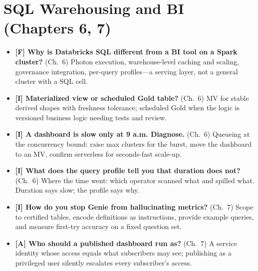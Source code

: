 \section{SQL Warehousing and BI (Chapters 6, 7)}
%
\begin{itemize}
    \item \textbf{[F] Why is Databricks SQL different from a BI tool on a Spark cluster?}
    (Ch.~6) Photon execution, warehouse-level caching and scaling, governance integration,
    per-query profiles---a serving layer, not a general cluster with a SQL cell.
    \item \textbf{[I] Materialized view or scheduled Gold table?} (Ch.~6) MV for stable
    derived shapes with freshness tolerance; scheduled Gold when the logic is versioned
    business logic needing tests and review.
    \item \textbf{[I] A dashboard is slow only at 9 a.m. Diagnose.} (Ch.~6) Queueing at the
    concurrency bound: raise max clusters for the burst, move the dashboard to an MV, confirm
    serverless for seconds-fast scale-up.
    \item \textbf{[I] What does the query profile tell you that duration does not?} (Ch.~6)
    Where the time went: which operator scanned what and spilled what. Duration says slow; the
    profile says why.
    \item \textbf{[I] How do you stop Genie from hallucinating metrics?} (Ch.~7) Scope to
    certified tables, encode definitions as instructions, provide example queries, and measure
    first-try accuracy on a fixed question set.
    \item \textbf{[A] Who should a published dashboard run as?} (Ch.~7) A service identity
    whose access equals what subscribers may see; publishing as a privileged user silently
    escalates every subscriber's access.
\end{itemize}

